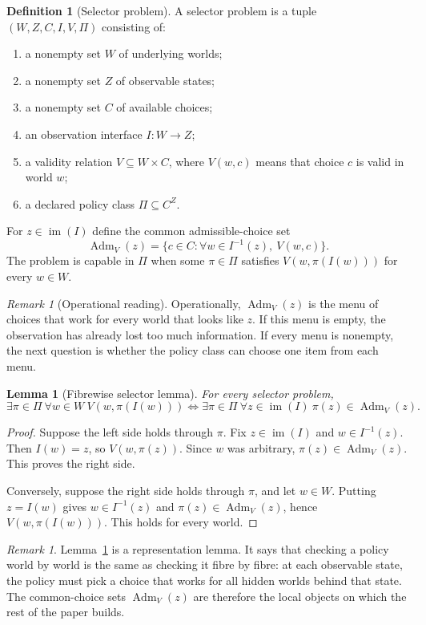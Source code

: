 \documentclass[11pt]{article}
\theoremstyle{plain}
\newtheorem{lemma}[theorem]{Lemma}
\theoremstyle{definition}
\newtheorem{definition}[theorem]{Definition}
\theoremstyle{remark}
\newtheorem{remark}[theorem]{Remark}
\newcommand{\im}{\operatorname{im}}
\newcommand{\Adm}{\operatorname{Adm}}
\begin{document}
\begin{definition}[Selector problem]\label{def:selector}
A selector problem is a tuple $(W,Z,C,I,V,\Pi)$ consisting of:
\begin{enumerate}[label=(\roman*)]
\item a nonempty set $W$ of underlying worlds;
\item a nonempty set $Z$ of observable states;
\item a nonempty set $C$ of available choices;
\item an observation interface $I:W\to Z$;
\item a validity relation $V\subseteq W\times C$, where $V(w,c)$ means that
choice $c$ is valid in world $w$;
\item a declared policy class $\Pi\subseteq C^Z$.
\end{enumerate}
For $z\in\im(I)$ define the common admissible-choice set
\[
\Adm_V(z)=\{c\in C:\forall w\in I^{-1}(z),\ V(w,c)\}.
\]
The problem is capable in $\Pi$ when some $\pi\in\Pi$ satisfies
$V(w,\pi(I(w)))$ for every $w\in W$.
\end{definition}

\begin{remark}[Operational reading]
Operationally, $\Adm_V(z)$ is the menu of choices that work for every world
that looks like $z$. If this menu is empty, the observation has already lost too
much information. If every menu is nonempty, the next question is whether the
policy class can choose one item from each menu.
\end{remark}

\begin{lemma}[Fibrewise selector lemma]\label{lem:selector}
For every selector problem,
\[
\exists\pi\in\Pi\ \forall w\in W\ V(w,\pi(I(w)))
\iff
\exists\pi\in\Pi\ \forall z\in\im(I)\ \pi(z)\in\Adm_V(z).
\]
\end{lemma}

\begin{proof}
Suppose the left side holds through $\pi$. Fix $z\in\im(I)$ and
$w\in I^{-1}(z)$. Then $I(w)=z$, so $V(w,\pi(z))$. Since $w$ was arbitrary,
$\pi(z)\in\Adm_V(z)$. This proves the right side.

Conversely, suppose the right side holds through $\pi$, and let $w\in W$.
Putting $z=I(w)$ gives $w\in I^{-1}(z)$ and
$\pi(z)\in\Adm_V(z)$, hence $V(w,\pi(I(w)))$. This holds for every world.
\end{proof}

\begin{remark}
Lemma~\ref{lem:selector} is a representation lemma. It says that checking a
policy world by world is the same as checking it fibre by fibre: at each
observable state, the policy must pick a choice that works for all hidden worlds
behind that state. The common-choice sets $\Adm_V(z)$ are therefore the local
objects on which the rest of the paper builds.
\end{remark}
\end{document}

